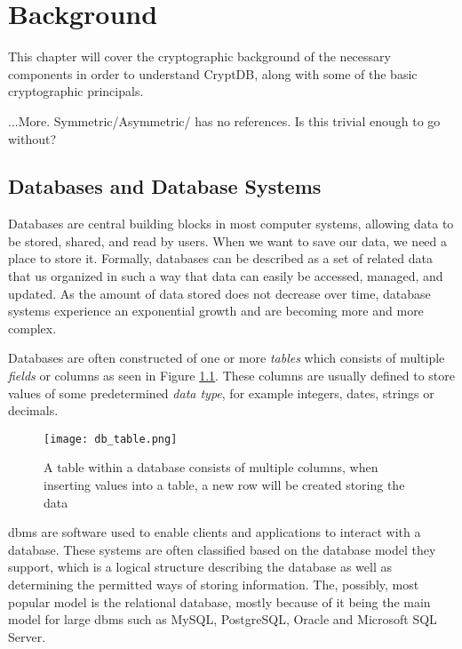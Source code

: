 \chapter{Background}
\label{chp:background}

This chapter will cover the cryptographic background of the necessary components in order to understand CryptDB, along with some of the basic cryptographic principals.

...More. Symmetric/Asymmetric/ has no references. Is this trivial enough to go without?



\section{Databases and Database Systems}

Databases are central building blocks in most computer systems, allowing data to be stored, shared, and read by users. When we want to save our data, we need a place to store it. Formally, databases can be described as a set of related data that us organized in such a way that data can easily be accessed, managed, and updated. As the amount of data stored does not decrease over time, database systems experience an exponential growth and are becoming more and more complex.

Databases are often constructed of one or more \emph{tables} which consists of multiple \emph{fields} or columns as seen in Figure \ref{fig:db_table}. These columns are usually defined to store values of some predetermined \emph{data type}, for example integers, dates, strings or decimals. 

\begin{figure}[h]
	\centering
	\texttt{[image: db\_table.png]}
	\caption{A table within a database consists of multiple columns, when inserting values into a table, a new row will be created storing the data}
	\label{fig:db_table}
\end{figure}

\gls{dbms} are software used to enable clients and applications to interact with a database. These systems are often classified based on the database model they support, which is a logical structure describing the database as well as determining the permitted ways of storing information. The, possibly, most popular model is the relational database, mostly because of it being the main model for large \gls{dbms} such as MySQL, PostgreSQL, Oracle and Microsoft SQL Server.


